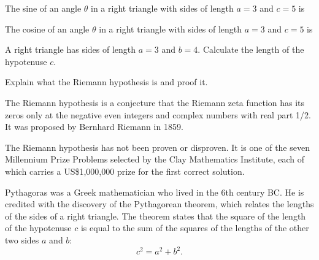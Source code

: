 \begin{questions}
  \question [1] The sine of an angle $\theta$ in a right triangle with sides of length $a = 3$ and $c = 5$ is\\
  \begin{oneparcheckboxes}
  \end{oneparcheckboxes}
  \question [2] The cosine of an angle $\theta$ in a right triangle with sides of length $a = 3$ and $c = 5$ is
  \begin{checkboxes}
  \end{checkboxes}
  \question [1] 
  A right triangle has sides of length $a = 3$ and $b = 4$. Calculate the length of the hypotenuse $c$.
  \answerline

  \question [3]
  Explain what the Riemann hypothesis is and proof it.
  \begin{solutionorbox}[4cm] %
    The Riemann hypothesis is a conjecture that the Riemann zeta function has its zeros only at the negative even integers and complex numbers with real part 1/2. It was proposed by Bernhard Riemann in 1859.

    The Riemann hypothesis has not been proven or disproven. It is one of the seven Millennium Prize Problems selected by the Clay Mathematics Institute, each of which carries a US\$1,000,000 prize for the first correct solution.
  \end{solutionorbox}

  \examnewpage

  
  \question

  Pythagoras was a Greek mathematician who lived in the 6th century BC. He is credited with the discovery of the Pythagorean theorem, which relates the lengths of the sides of a right triangle. The theorem states that the square of the length of the hypotenuse $c$ is equal to the sum of the squares of the lengths of the other two sides $a$ and $b$:
  \begin{equation}
    c^2 = a^2 + b^2.
    \label{eq:pythagoras}
  \end{equation}
  

\end{questions}
